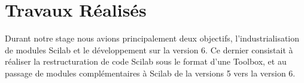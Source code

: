 \section*{Travaux Réalisés}

Durant notre stage nous avions principalement deux objectifs,
l’industrialisation de modules Scilab et le développement sur
la version 6.
Ce dernier consistait \`a réaliser la restructuration de code Scilab sous
le format d’une Toolbox, et au passage de modules complémentaires
à Scilab de la versions 5 vers la version 6.





